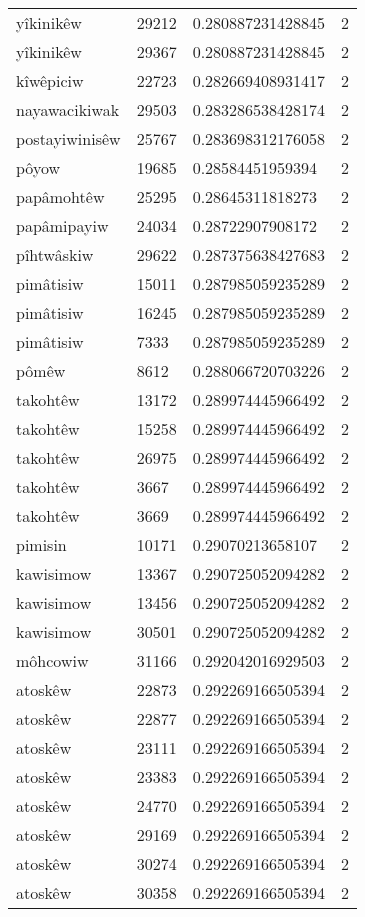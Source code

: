 \begin{longtable}{llll}
yîkinikêw & 29212 & 0.280887231428845 & 2 \\
yîkinikêw & 29367 & 0.280887231428845 & 2 \\
kîwêpiciw & 22723 & 0.282669408931417 & 2 \\
nayawacikiwak & 29503 & 0.283286538428174 & 2 \\
postayiwinisêw & 25767 & 0.283698312176058 & 2 \\
pôyow & 19685 & 0.28584451959394 & 2 \\
papâmohtêw & 25295 & 0.28645311818273 & 2 \\
papâmipayiw & 24034 & 0.28722907908172 & 2 \\
pîhtwâskiw & 29622 & 0.287375638427683 & 2 \\
pimâtisiw & 15011 & 0.287985059235289 & 2 \\
pimâtisiw & 16245 & 0.287985059235289 & 2 \\
pimâtisiw & 7333 & 0.287985059235289 & 2 \\
pômêw & 8612 & 0.288066720703226 & 2 \\
takohtêw & 13172 & 0.289974445966492 & 2 \\
takohtêw & 15258 & 0.289974445966492 & 2 \\
takohtêw & 26975 & 0.289974445966492 & 2 \\
takohtêw & 3667 & 0.289974445966492 & 2 \\
takohtêw & 3669 & 0.289974445966492 & 2 \\
pimisin & 10171 & 0.29070213658107 & 2 \\
kawisimow & 13367 & 0.290725052094282 & 2 \\
kawisimow & 13456 & 0.290725052094282 & 2 \\
kawisimow & 30501 & 0.290725052094282 & 2 \\
môhcowiw & 31166 & 0.292042016929503 & 2 \\
atoskêw & 22873 & 0.292269166505394 & 2 \\
atoskêw & 22877 & 0.292269166505394 & 2 \\
atoskêw & 23111 & 0.292269166505394 & 2 \\
atoskêw & 23383 & 0.292269166505394 & 2 \\
atoskêw & 24770 & 0.292269166505394 & 2 \\
atoskêw & 29169 & 0.292269166505394 & 2 \\
atoskêw & 30274 & 0.292269166505394 & 2 \\
atoskêw & 30358 & 0.292269166505394 & 2 \\

\end{longtable}
